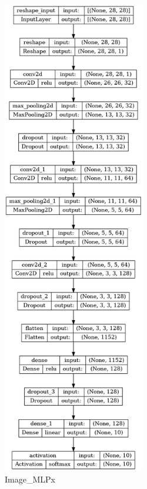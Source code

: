 \begin{figure}[!hb]
\begin{minipage}{0.5\textwidth}
        \includegraphics[width=6.2cm]{obrazky-figures/model-plots/Image_CNN.png} %
        \caption{Image\_MLPx}
    \end{minipage}
\end{figure}
